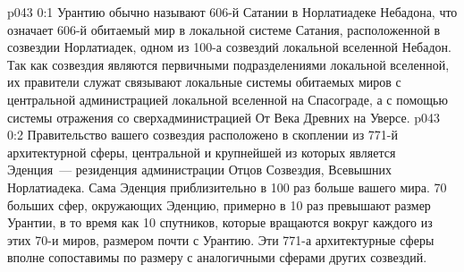 \author{Малаватия Мелхиседек}
\vs p043 0:1 Урантию обычно называют 606-й Сатании в Норлатиадеке Небадона, что означает 606-й обитаемый мир в локальной системе Сатания, расположенной в созвездии Норлатиадек, одном из 100-а созвездий локальной вселенной Небадон. Так как созвездия являются первичными подразделениями локальной вселенной, их правители служат связывают локальные системы обитаемых миров с центральной администрацией локальной вселенной на Спасограде, а с помощью системы отражения со сверхадминистрацией От Века Древних на Уверсе.
\vs p043 0:2 \pc Правительство вашего созвездия расположено в скоплении из 771-й архитектурной сферы, центральной и крупнейшей из которых является Эденция~--- резиденция администрации Отцов Созвездия, Всевышних Норлатиадека. Сама Эденция приблизительно в 100 раз больше вашего мира. 70 больших сфер, окружающих Эденцию, примерно в 10 раз превышают размер Урантии, в то время как 10 спутников, которые вращаются вокруг каждого из этих 70-и миров, размером почти с Урантию. Эти 771-а архитектурные сферы вполне сопоставимы по размеру с аналогичными сферами других созвездий.
